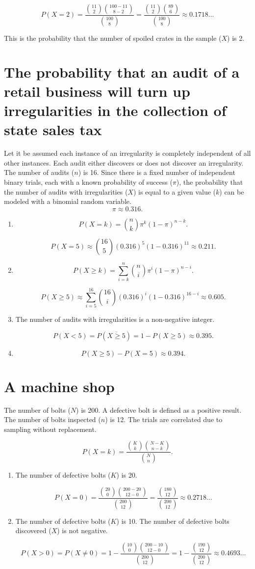 \documentclass[12pt]{article}
\begin{document}
\[P(X=2)=\frac{\binom{11}{2}\binom{100-11}{8-2}}{\binom{100}{8}}=\frac{\binom{11}{2}\binom{89}{6}}{\binom{100}{8}}\approx 0.1718\dots\]

This is the probability that the number of spoiled crates in the sample ($X$) is 2.
\section{The probability that an audit of a retail business will turn up irregularities in the collection of state sales tax}
Let it be assumed each instance of an irregularity is completely independent of all other instances. Each audit either discovers or  does not discover an irregularity. The number of audits ($n$) is 16. Since there is a fixed number of independent binary trials, each with a known probability of success ($\pi$), the probability that the number of audits with irregularities ($X$) is equal to a given value ($k$) can be modeled with a binomial random variable.
\[\pi\approx 0.316.\]

\begin{enumerate}
\item
\[P(X=k)=\binom{n}{k}\pi^k(1-\pi)^{n-k}.\]

\[P(X=5)\approx\binom{16}{5}(0.316)^5(1-0.316)^{11}\approx 0.211.\]
\item
\[P(X\geq k)=\sum^n_{i=k}{\binom{n}{i}\pi^i(1-\pi)^{n-i}}.\]

\[P(X\geq 5)\approx\sum^{16}_{i=5}{\binom{16}{i}(0.316)^i(1-0.316)^{16-i}}\approx 0.605.\]
\item
The number of audits with irregularities is a non-negative integer.

\[P(X<5)=P(\overline{X\geq 5})=1-P(X\geq 5)\approx 0.395.\]
\item \[P(X\geq 5)-P(X=5)\approx 0.394.\]
\end{enumerate}
\section{A machine shop}
The number of bolts ($N$) is 200. A defective bolt is defined as a positive result. The number of bolts inspected ($n$) is 12. The trials are correlated due to sampling without replacement. 

\[P(X=k)=\frac{\binom{K}{k}\binom{N-K}{n-k}}{\binom{N}{n}}.\]

\begin{enumerate}
\item
The number of defective bolts ($K$) is 20.

\[P(X=0)=\frac{\binom{20}{0}\binom{200-20}{12-0}}{\binom{200}{12}}=\frac{\binom{180}{12}}{\binom{200}{12}}\approx 0.2718\dots\]
\item
The number of defective bolts ($K$) is 10. The number of defective bolts discovered ($X$) is not negative.

\[P(X>0)=P(X\neq 0)=1-\frac{\binom{10}{0}\binom{200-10}{12-0}}{\binom{200}{12}}=1-\frac{\binom{190}{12}}{\binom{200}{12}}\approx 0.4693\dots\]
\end{enumerate}
\end{document}
